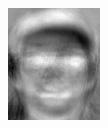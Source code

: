 \begin{frame}
\begin{columns}
\begin{overlayarea}{\textwidth}{\textheight}
{\begin{minipage}[t]{0.15\textwidth}
          \includegraphics[width=\textwidth]{images/eig_docked_image/eig_6.jpeg}
        \end{minipage}
        \begin{minipage}[t]{0.15\textwidth}

\end{minipage}}
\end{overlayarea}
\end{columns}
\end{frame}

